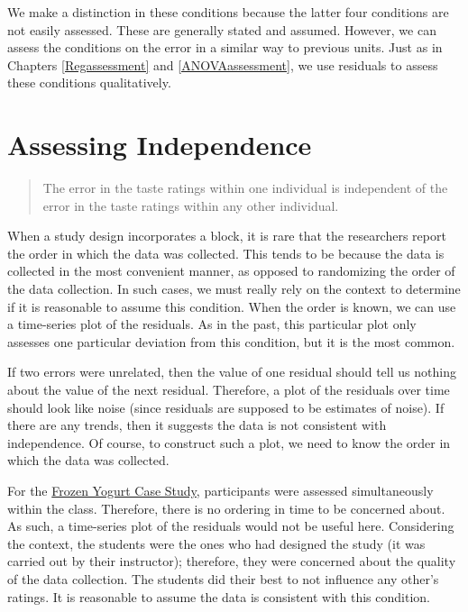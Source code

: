 \documentclass[
]{book}
\theoremstyle{plain}
\theoremstyle{mydefn}
\theoremstyle{myexmpl}
\theoremstyle{remark}
\begin{document}
We make a distinction in these conditions because the latter four conditions are not easily assessed. These are generally stated and assumed. However, we can assess the conditions on the error in a similar way to previous units. Just as in Chapters \ref{Regassessment} and \ref{ANOVAassessment}, we use residuals to assess these conditions qualitatively.

\hypertarget{assessing-independence-2}{%
\section{Assessing Independence}\label{assessing-independence-2}}

\begin{quote}
The error in the taste ratings within one individual is independent of the error in the taste ratings within any other individual.
\end{quote}

When a study design incorporates a block, it is rare that the researchers report the order in which the data was collected. This tends to be because the data is collected in the most convenient manner, as opposed to randomizing the order of the data collection. In such cases, we must really rely on the context to determine if it is reasonable to assume this condition. When the order is known, we can use a time-series plot of the residuals. As in the past, this particular plot only assesses one particular deviation from this condition, but it is the most common.

If two errors were unrelated, then the value of one residual should tell us nothing about the value of the next residual. Therefore, a plot of the residuals over time should look like noise (since residuals are supposed to be estimates of noise). If there are any trends, then it suggests the data is not consistent with independence. Of course, to construct such a plot, we need to know the order in which the data was collected.

For the \protect\hyperlink{CaseOrganic}{Frozen Yogurt Case Study}, participants were assessed simultaneously within the class. Therefore, there is no ordering in time to be concerned about. As such, a time-series plot of the residuals would not be useful here. Considering the context, the students were the ones who had designed the study (it was carried out by their instructor); therefore, they were concerned about the quality of the data collection. The students did their best to not influence any other's ratings. It is reasonable to assume the data is consistent with this condition.
\end{document}
